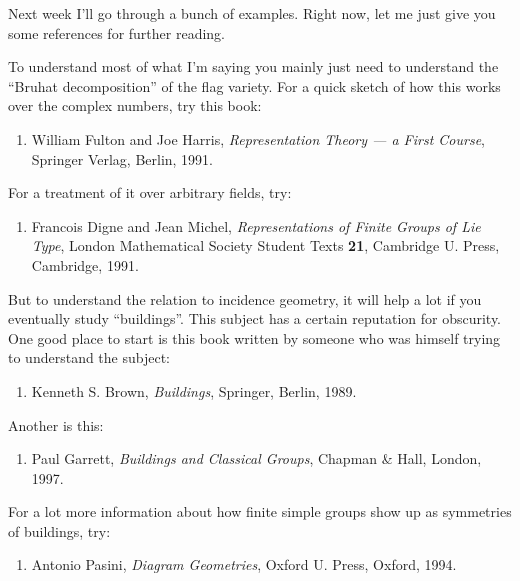 \documentclass{article}
\def\tightlist{}
\begin{document}
Next week I'll go through a bunch of examples. Right now, let me just
give you some references for further reading.

To understand most of what I'm saying you mainly just need to understand
the ``Bruhat decomposition'' of the flag variety. For a quick sketch of
how this works over the complex numbers, try this book:

\begin{enumerate}
\def\labelenumi{\arabic{enumi})}
\tightlist
\item
  William Fulton and Joe Harris, \emph{Representation Theory --- a First
  Course}, Springer Verlag, Berlin, 1991.
\end{enumerate}

For a treatment of it over arbitrary fields, try:

\begin{enumerate}
\def\labelenumi{\arabic{enumi})}
\setcounter{enumi}{1}
\tightlist
\item
  Francois Digne and Jean Michel, \emph{Representations of Finite Groups
  of Lie Type}, London Mathematical Society Student Texts \textbf{21},
  Cambridge U. Press, Cambridge, 1991.
\end{enumerate}

But to understand the relation to incidence geometry, it will help a lot
if you eventually study ``buildings''. This subject has a certain
reputation for obscurity. One good place to start is this book written
by someone who was himself trying to understand the subject:

\begin{enumerate}
\def\labelenumi{\arabic{enumi})}
\setcounter{enumi}{2}
\tightlist
\item
  Kenneth S. Brown, \emph{Buildings}, Springer, Berlin, 1989.
\end{enumerate}

Another is this:

\begin{enumerate}
\def\labelenumi{\arabic{enumi})}
\setcounter{enumi}{3}
\tightlist
\item
  Paul Garrett, \emph{Buildings and Classical Groups}, Chapman \& Hall,
  London, 1997.
\end{enumerate}

For a lot more information about how finite simple groups show up as
symmetries of buildings, try:

\begin{enumerate}
\def\labelenumi{\arabic{enumi})}
\setcounter{enumi}{4}
\tightlist
\item
  Antonio Pasini, \emph{Diagram Geometries}, Oxford U. Press, Oxford,
  1994.
\end{enumerate}
\end{document}
